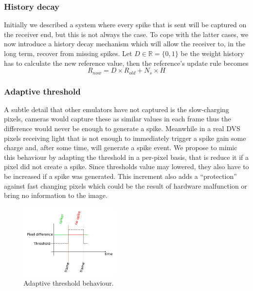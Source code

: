 \documentclass[twocolumn]{article}
\begin{document}
\subsubsection{History decay} %

Initially we described a system where every spike that is sent will be captured on the receiver end, but this is not always the case. To cope with the latter cases, we now introduce a history decay mechanism which will allow the receiver to, in the long term, recover from missing spikes. Let $D \in \mathbb{R} = \{0, 1\}$ be the weight history has to calculate the new reference value, then the reference's update rule becomes
\begin{equation}
\label{eq:ref_update_decay}
R_{now} = D\times R_{old} + N_{s}\times H
\end{equation}

%

\subsubsection{Adaptive threshold} 
A subtle detail that other emulators have not captured is the slow-charging pixels, cameras would capture these as similar values in each frame thus the difference would never be enough to generate a spike. Meanwhile in a real DVS pixels receiving light that is not enough to immediately trigger a spike gain some charge and, after some time, will generate a spike event. We propose to mimic this behaviour by adapting the threshold in a per-pixel basis, that is reduce it if a pixel did not create a spike. Since thresholds value may lowered, they also have to be increased if a spike was generated. This increment also adds a ``protection'' against fast changing pixels which could be the result of hardware malfunction or bring no information to the image. 

%
\begin{figure}
  \includegraphics[width=0.45\textwidth]{adaptive_thresh}
  \caption{Adaptive threshold behaviour.}
  \label{fig:adpt_thresh}
\end{figure}
\end{document}
